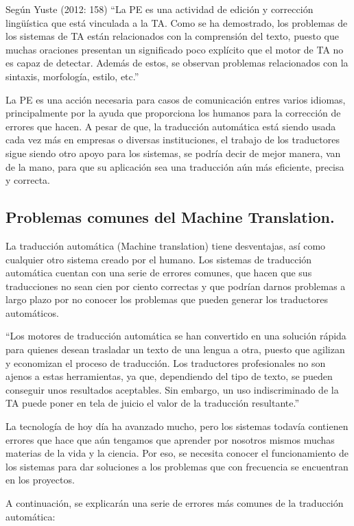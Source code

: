 \documentclass[conference]{IEEEtran}
\begin{document}
Según Yuste (2012: 158) “La PE es una actividad de edición y corrección lingüística que está vinculada a la TA. Como se ha demostrado, los problemas de los sistemas de TA están relacionados con la comprensión del texto, puesto que muchas oraciones presentan un significado poco explícito que el motor de TA no es capaz de detectar. Además de estos, se observan problemas relacionados con la sintaxis, morfología, estilo, etc.”\cite{b15}

	La PE es una acción necesaria para casos de comunicación entres varios idiomas, principalmente por la ayuda que proporciona los humanos para la corrección de errores que hacen. A pesar de que, la traducción automática está siendo usada cada vez más en empresas o diversas instituciones, el trabajo de los traductores sigue siendo otro apoyo para los sistemas, se podría decir de mejor manera, van de la mano, para que su aplicación sea una traducción aún más eficiente, precisa y correcta.


\subsection{Problemas comunes del Machine Translation.}
La traducción automática (Machine translation) tiene desventajas, así como cualquier otro sistema creado por el humano. Los sistemas de traducción automática cuentan con una serie de errores comunes, que hacen que sus traducciones no sean cien por ciento correctas y que podrían darnos problemas a largo plazo por no conocer los problemas que pueden generar los traductores automáticos.

	“Los motores de traducción automática se han convertido en una solución rápida para quienes desean trasladar un texto de una lengua a otra, puesto que agilizan y economizan el proceso de traducción. Los traductores profesionales no son ajenos a estas herramientas, ya que, dependiendo del tipo de texto, se pueden conseguir unos resultados aceptables. Sin embargo, un uso indiscriminado de la TA puede poner en tela de juicio el valor de la traducción resultante.”\cite{b9}
 
La tecnología de hoy día ha avanzado mucho, pero los sistemas todavía contienen errores que hace que aún tengamos que aprender por nosotros mismos muchas materias de la vida y la ciencia. Por eso, se necesita conocer el funcionamiento de los sistemas para dar soluciones a los problemas que con frecuencia se encuentran en los proyectos.

A continuación, se explicarán una serie de errores más comunes de la traducción automática:
 
\end{document}
